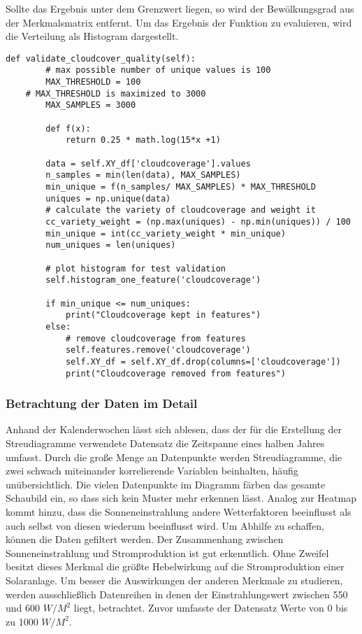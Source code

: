 \documentclass[12pt, a4paper]{article}
\begin{document}
Sollte das Ergebnis unter dem Grenzwert liegen, so wird der Bewölkungsgrad aus der Merkmalsmatrix entfernt. Um das Ergebnis der Funktion zu evaluieren, wird  die Verteilung als Histogram dargestellt. 

\begin{lstlisting}[basicstyle=\small,label={lst:validate_cloudcover}, caption={Funktion zur Validierung der Bewölkungsdaten}]
def validate_cloudcover_quality(self):
        # max possible number of unique values is 100
        MAX_THRESHOLD = 100
	# MAX_THRESHOLD is maximized to 3000
        MAX_SAMPLES = 3000       
        
        def f(x):            
            return 0.25 * math.log(15*x +1)
        
        data = self.XY_df['cloudcoverage'].values        
        n_samples = min(len(data), MAX_SAMPLES)
        min_unique = f(n_samples/ MAX_SAMPLES) * MAX_THRESHOLD
        uniques = np.unique(data)
        # calculate the variety of cloudcoverage and weight it
        cc_variety_weight = (np.max(uniques) - np.min(uniques)) / 100
        min_unique = int(cc_variety_weight * min_unique)
        num_uniques = len(uniques)
        
        # plot histogram for test validation
        self.histogram_one_feature('cloudcoverage')
                
        if min_unique <= num_uniques:
            print("Cloudcoverage kept in features")
        else:
            # remove cloudcoverage from features
            self.features.remove('cloudcoverage')
            self.XY_df = self.XY_df.drop(columns=['cloudcoverage'])
            print("Cloudcoverage removed from features")
\end{lstlisting}



\subsubsection{Betrachtung der Daten im Detail}

Anhand der Kalenderwochen lässt sich ablesen, dass der für die Erstellung der Streudiagramme verwendete Datensatz die Zeitspanne eines halben Jahres umfasst. Durch die große Menge an Datenpunkte werden Streudiagramme, die zwei schwach miteinander korrelierende Variablen beinhalten, häufig unübersichtlich. Die vielen Datenpunkte im Diagramm färben das gesamte Schaubild ein, so dass sich kein Muster mehr erkennen lässt. Analog zur Heatmap kommt hinzu, dass die Sonneneinstrahlung andere Wetterfaktoren beeinflusst als auch selbst von diesen wiederum beeinflusst wird. Um Abhilfe zu schaffen, können die Daten gefiltert werden. Der Zusammenhang zwischen Sonneneinstrahlung und Stromproduktion ist gut erkenntlich. Ohne Zweifel besitzt dieses Merkmal die größte Hebelwirkung auf die Stromproduktion einer Solaranlage. Um besser die Auswirkungen der anderen Merkmale zu studieren, werden ausschließlich Datenreihen in denen der Einstrahlungswert zwischen 550 und 600 $W/ M^2$ liegt, betrachtet. Zuvor umfasste der Datensatz Werte von 0 bis zu 1000 $W/ M^2$.
\end{document}

